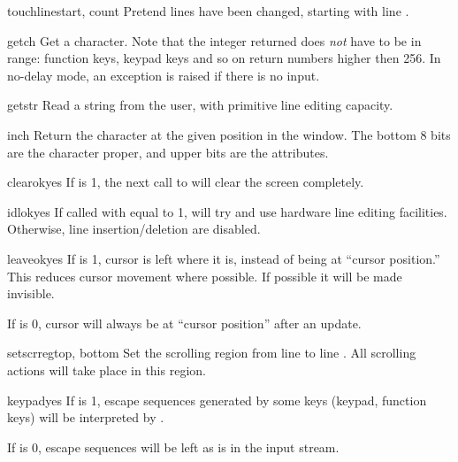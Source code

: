\begin{methoddesc}{touchline}{start, count}
Pretend  lines have been changed, starting with line
.
\end{methoddesc}

\begin{methoddesc}{getch}{}
Get a character. Note that the integer returned does \emph{not} have to
be in \ASCII{} range: function keys, keypad keys and so on return numbers
higher then 256. In no-delay mode, an exception is raised if there is 
no input.
\end{methoddesc}

\begin{methoddesc}{getstr}{}
Read a string from the user, with primitive line editing capacity.
\end{methoddesc}

\begin{methoddesc}{inch}{}
Return the character at the given position in the window. The bottom
8 bits are the character proper, and upper bits are the attributes.
\end{methoddesc}

\begin{methoddesc}{clearok}{yes}
If  is 1, the next call to 
will clear the screen completely.
\end{methoddesc}

\begin{methoddesc}{idlok}{yes}
If called with  equal to 1,  will try and use
hardware line editing facilities. Otherwise, line insertion/deletion
are disabled.
\end{methoddesc}

\begin{methoddesc}{leaveok}{yes}
If  is 1,
cursor is left where it is, instead of being at ``cursor position.''
This reduces cursor movement where possible. If possible it will be made
invisible.

If  is 0, cursor will always be at
``cursor position'' after an update.
\end{methoddesc}

\begin{methoddesc}{setscrreg}{top, bottom}
Set the scrolling region from line  to line . All
scrolling actions will take place in this region.
\end{methoddesc}

\begin{methoddesc}{keypad}{yes}
If  is 1, escape sequences generated by some keys (keypad, 
function keys) will be interpreted by .

If  is 0, escape sequences will be left as is in the input
stream.
\end{methoddesc}

